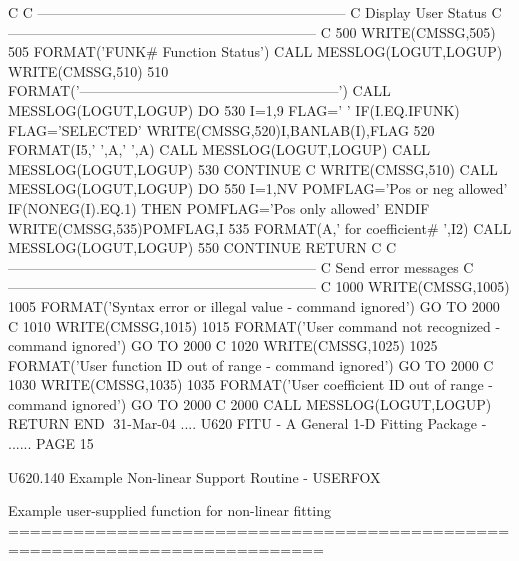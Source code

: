    C
   C     ------------------------------------------------------------------
   C     Display User Status
   C     ------------------------------------------------------------------
   C
     500 WRITE(CMSSG,505)
     505 FORMAT('FUNK#  Function                                 Status')
         CALL MESSLOG(LOGUT,LOGUP)
         WRITE(CMSSG,510)
     510 FORMAT('--------------------------------------------------------')
         CALL MESSLOG(LOGUT,LOGUP)
         DO 530 I=1,9
         FLAG=' '
         IF(I.EQ.IFUNK) FLAG='SELECTED'
         WRITE(CMSSG,520)I,BANLAB(I),FLAG
     520 FORMAT(I5,'  ',A,' ',A)
         CALL MESSLOG(LOGUT,LOGUP)
         CALL MESSLOG(LOGUT,LOGUP)
     530 CONTINUE
   C
         WRITE(CMSSG,510)
         CALL MESSLOG(LOGUT,LOGUP)
         DO 550 I=1,NV
         POMFLAG='Pos or neg allowed'
         IF(NONEG(I).EQ.1) THEN
         POMFLAG='Pos only   allowed'
         ENDIF
         WRITE(CMSSG,535)POMFLAG,I
     535 FORMAT(A,' for coefficient# ',I2)
         CALL MESSLOG(LOGUT,LOGUP)
     550 CONTINUE
         RETURN
   C
   C     ------------------------------------------------------------------
   C     Send error messages
   C     ------------------------------------------------------------------
   C
    1000 WRITE(CMSSG,1005)
    1005 FORMAT('Syntax error or illegal value - command ignored')
         GO TO 2000
   C
    1010 WRITE(CMSSG,1015)
    1015 FORMAT('User command not recognized - command ignored')
         GO TO 2000
   C
    1020 WRITE(CMSSG,1025)
    1025 FORMAT('User function ID out of range - command ignored')
         GO TO 2000
   C
    1030 WRITE(CMSSG,1035)
    1035 FORMAT('User coefficient ID out of range - command ignored')
         GO TO 2000
   C
    2000 CALL MESSLOG(LOGUT,LOGUP)
         RETURN
         END
    
   31-Mar-04 .... U620  FITU - A General 1-D Fitting Package - ...... PAGE  15
 
 
   U620.140  Example Non-linear Support Routine - USERFOX
 
   Example user-supplied function for non-linear fitting
   ===========================================================================
 
